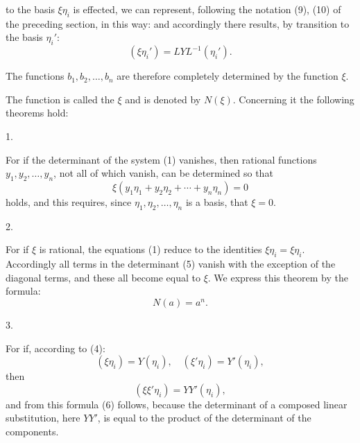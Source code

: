 to the basis $\xi\eta_i$ is effected, we can represent, following the notation (9), (10) of the preceding section, in this way:
and accordingly there results, by transition to the basis $\eta_i'$:
\[
(\xi\eta_i') = LYL^{-1}(\eta_i').
\]

The functions $b_1, b_2, \ldots, b_n$ are therefore completely determined by the function $\xi$.

The function
is called the  $\xi$ and is denoted by $N(\xi)$. Concerning it the following theorems hold:

1. 

For if the determinant of the system (1) vanishes, then rational functions $y_1, y_2, \ldots, y_n$, not all of which vanish, can be determined so that
\[
\xi(y_1\eta_1 + y_2\eta_2 + \cdots + y_n\eta_n) = 0
\]
holds, and this requires, since $\eta_1, \eta_2, \ldots, \eta_n$ is a basis, that $\xi = 0$.

2. 

For if $\xi$ is rational, the equations (1) reduce to the identities $\xi\eta_i = \xi\eta_i$. Accordingly all terms in the determinant (5) vanish with the exception of the diagonal terms, and these all become equal to $\xi$. We express this theorem by the formula:
\[
N(a) = a^n.
\]

3. 

For if, according to (4):
\[
(\xi\eta_i) = Y(\eta_i), \quad (\xi'\eta_i) = Y'(\eta_i),
\]
then
\[
(\xi\xi'\eta_i) = YY'(\eta_i),
\]
and from this formula (6) follows, because the determinant of a composed linear substitution, here $YY'$, is equal to the product of the determinant of the components.
